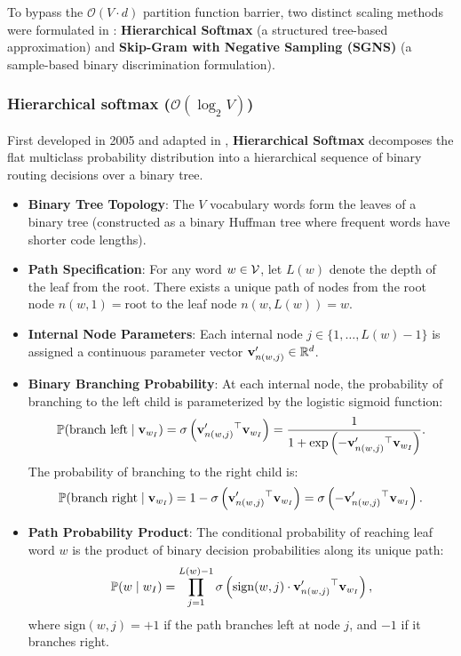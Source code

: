 \documentclass[../../../main.tex]{subfiles}
\begin{document}
To bypass the $\mathcal{O}(V \cdot d)$ partition function barrier, two distinct scaling methods were formulated in \cite{mikolov2013distributed}: \textbf{Hierarchical Softmax} (a structured tree-based approximation) and \textbf{Skip-Gram with Negative Sampling (SGNS)} (a sample-based binary discrimination formulation).

\subsubsection{Hierarchical softmax (\texorpdfstring{$\mathcal{O}(\log_2 V)$}{O(log2 V)})}
\label{subsec:hierarchical_softmax}

First developed in 2005 \cite{morin2005hierarchical} and adapted in \cite{mikolov2013distributed}, \textbf{Hierarchical Softmax} decomposes the flat multiclass probability distribution into a hierarchical sequence of binary routing decisions over a binary tree.

\begin{itemize}
    \item \textbf{Binary Tree Topology}: The $V$ vocabulary words form the leaves of a binary tree (constructed as a binary Huffman tree where frequent words have shorter code lengths).
    \item \textbf{Path Specification}: For any word $w \in \mathcal{V}$, let $L(w)$ denote the depth of the leaf from the root. There exists a unique path of nodes from the root node $n(w, 1) = \text{root}$ to the leaf node $n(w, L(w)) = w$.
    \item \textbf{Internal Node Parameters}: Each internal node $j \in \{1, \dots, L(w)-1\}$ is assigned a continuous parameter vector $\mathbf{v}'_{n(w, j)} \in \mathbb{R}^d$.
    \item \textbf{Binary Branching Probability}: At each internal node, the probability of branching to the left child is parameterized by the logistic sigmoid function:
    \begin{equation}
    \label{eq:hierarchical_branch}
    \mathbb{P}(\text{branch left} \mid \mathbf{v}_{w_I}) = \sigma\left( \mathbf{v}'_{n(w, j)}{}^\top \mathbf{v}_{w_I} \right) = \frac{1}{1 + \exp\left( -\mathbf{v}'_{n(w, j)}{}^\top \mathbf{v}_{w_I} \right)}.
    \end{equation}
    The probability of branching to the right child is:
    \begin{equation}
    \label{eq:hierarchical_right}
    \mathbb{P}(\text{branch right} \mid \mathbf{v}_{w_I}) = 1 - \sigma\left( \mathbf{v}'_{n(w, j)}{}^\top \mathbf{v}_{w_I} \right) = \sigma\left( -\mathbf{v}'_{n(w, j)}{}^\top \mathbf{v}_{w_I} \right).
    \end{equation}
    \item \textbf{Path Probability Product}: The conditional probability of reaching leaf word $w$ is the product of binary decision probabilities along its unique path:
    \begin{equation}
    \label{eq:hierarchical_softmax}
    \mathbb{P}(w \mid w_I) = \prod_{j=1}^{L(w)-1} \sigma\left( \text{sign}(w, j) \cdot \mathbf{v}'_{n(w, j)}{}^\top \mathbf{v}_{w_I} \right),
    \end{equation}
    where $\text{sign}(w, j) = +1$ if the path branches left at node $j$, and $-1$ if it branches right.
\end{itemize}
\end{document}
